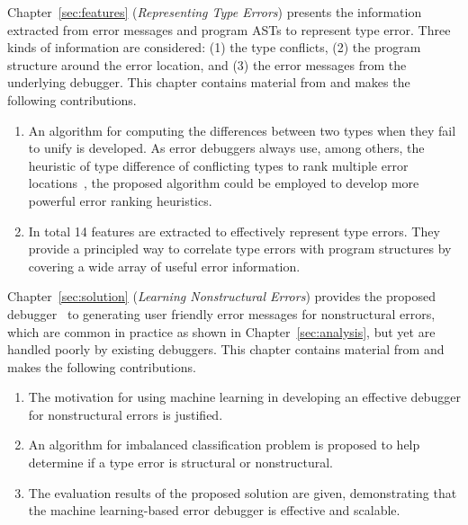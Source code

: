 \documentclass[12pt]{report}	%
\begin{document}
Chapter~\ref{sec:features} (\emph{Representing Type Errors}) presents the information extracted from error messages and program ASTs 
to represent type error. 
Three kinds of information are considered: (1) the type conflicts, (2) the program structure around the error location,
and (3) the error messages from the underlying debugger.
This chapter contains material from \cite{wu2017learning} and makes the following contributions.

\begin{enumerate}
\item An algorithm for computing the differences between two types when they fail to unify is developed.
As error debuggers always use, among others, the heuristic of type difference of conflicting types to rank multiple error locations~\cite{Chen14:CFT,Hage07:HTE},
the proposed algorithm could be employed to develop more powerful error ranking heuristics.

\item In total 14 features are extracted to effectively represent type errors.
They provide a principled way to correlate type errors with program structures by covering a wide array of useful error information.
\end{enumerate}

Chapter~\ref{sec:solution} (\emph{Learning Nonstructural Errors}) provides the proposed debugger \newCompiler\ 
to generating user friendly error messages for nonstructural errors,
which are common in practice as shown in Chapter~\ref{sec:analysis}, but yet are handled poorly by existing debuggers.
This chapter contains material from \cite{wu2017learning} and makes the following contributions.

\begin{enumerate}
\item The motivation for using machine learning in developing an effective debugger for nonstructural errors is justified.

\item An algorithm for imbalanced classification problem is proposed to help determine if a type error is structural or nonstructural.

\item The evaluation results of the proposed solution are given, demonstrating that the machine learning-based error debugger is effective and scalable.
\end{enumerate}
\end{document}
